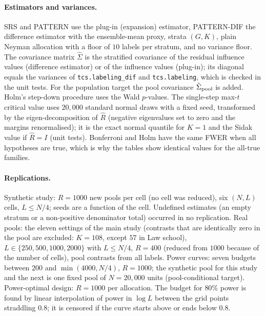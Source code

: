 \paragraph{Estimators and variances.} SRS and PATTERN use the plug-in (expansion) estimator, PATTERN-DIF the difference estimator with the ensemble-mean proxy, strata $(G,K)$, plain Neyman allocation with a floor of $10$ labels per stratum, and no variance floor. The covariance matrix $\hat\Sigma$ is the stratified covariance of the residual influence values (difference estimator) or of the influence values (plug-in); its diagonal equals the variances of \texttt{tcs.labeling\_dif} and \texttt{tcs.labeling}, which is checked in the unit tests. For the population target the pool covariance $\hat\Sigma_{\rm pool}$ is added. Holm's step-down procedure \citep{holm1979} uses the Wald $p$-values. The single-step max-$t$ critical value uses $20{,}000$ standard normal draws with a fixed seed, transformed by the eigen-decomposition of $\hat R$ (negative eigenvalues set to zero and the margins renormalised); it is the exact normal quantile for $K=1$ and the Sidak value if $\hat R=I$ (unit tests). Bonferroni and Holm have the same FWER when all hypotheses are true, which is why the tables show identical values for the all-true families.

\paragraph{Replications.} Synthetic study: $R=1000$ new pools per cell (no cell was reduced), six $(N,L)$ cells, $L\le N/4$; seeds are a function of the cell. Undefined estimates (an empty stratum or a non-positive denominator total) occurred in no replication. Real pools: the eleven settings of the main study (contrasts that are identically zero in the pool are excluded: $K=108$, except $57$ in Law school), $L\in\{250,500,1000,2000\}$ with $L\le N/4$, $R=400$ (reduced from $1000$ because of the number of cells), pool contrasts from all labels. Power curves: seven budgets between $200$ and $\min(4000,N/4)$, $R=1000$; the synthetic pool for this study and the next is one fixed pool of $N=20{,}000$ units (pool-conditional target). Power-optimal design: $R=1000$ per allocation. The budget for $80\%$ power is found by linear interpolation of power in $\log L$ between the grid points straddling $0.8$; it is censored if the curve starts above or ends below $0.8$.

